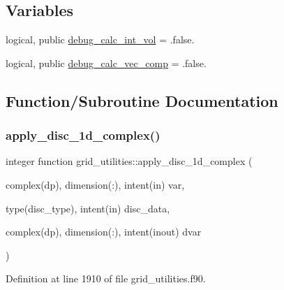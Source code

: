 \subsection*{Variables}
\begin{DoxyCompactItemize}
\item 
logical, public \hyperlink{namespacegrid__utilities_a0743c0341d508034b14aee614fa4f8a9}{debug\+\_\+calc\+\_\+int\+\_\+vol} = .false.
\item 
logical, public \hyperlink{namespacegrid__utilities_ab420036236dc8a9a69e180550499d95b}{debug\+\_\+calc\+\_\+vec\+\_\+comp} = .false.
\end{DoxyCompactItemize}


\subsection{Function/\+Subroutine Documentation}
\mbox{\label{namespacegrid__utilities_a948a0ef995a14a7a80464933e8c28029}} 
\subsubsection{\texorpdfstring{apply\+\_\+disc\+\_\+1d\+\_\+complex()}{apply\_disc\_1d\_complex()}}
{\footnotesize\ttfamily integer function grid\+\_\+utilities\+::apply\+\_\+disc\+\_\+1d\+\_\+complex (\begin{DoxyParamCaption}\item[{complex(dp), dimension(\+:), intent(in)}]{var,  }\item[{type(disc\+\_\+type), intent(in)}]{disc\+\_\+data,  }\item[{complex(dp), dimension(\+:), intent(inout)}]{dvar }\end{DoxyParamCaption})}



Definition at line 1910 of file grid\+\_\+utilities.\+f90.

